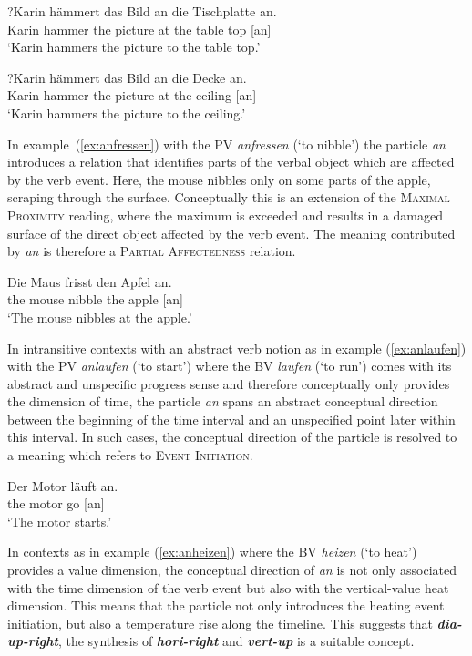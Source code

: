 \documentclass[output=paper]{langsci/langscibook}
\newcommand{\textci}[1]{\textit{\textbf{#1}}}
\begin{document}
\ea\label{ex:anhaemmernTischplatte}
\gll ?Karin hämmert das Bild an die Tischplatte an.\\
Karin hammer the picture at the {table top} [an]\\
\glt `Karin hammers the picture to the table top.'
\z

\ea\label{ex:anhaemmernDecke}
\gll ?Karin hämmert das Bild an die Decke an.\\
Karin hammer the picture at the ceiling [an]\\
\glt `Karin hammers the picture to the ceiling.'
\z

In example~(\ref{ex:anfressen}) with the PV \textit{anfressen} (`to
nibble') the particle \textit{an} introduces a relation that
identifies parts of the verbal object which are affected by the verb
event. Here, the mouse nibbles only on some parts of the apple,
scraping through the surface. Conceptually this is an extension of the
\textsc{Maximal Proximity} reading, where the maximum is exceeded and
results in a damaged surface of the direct object affected by the verb
event. The meaning contributed by \textit{an} is therefore a
\textsc{Partial Affectedness} relation.

\ea\label{ex:anfressen}
\gll Die Maus frisst den Apfel an.\\
the mouse nibble the apple [an]\\
\glt `The mouse nibbles at the apple.'
\z

In intransitive contexts with an abstract verb notion as in example
(\ref{ex:anlaufen}) with the PV \textit{anlaufen} (`to start') where
the BV \textit{laufen} (`to run') comes with its abstract and
unspecific progress sense and therefore conceptually only provides the
dimension of time, the particle \textit{an} spans an abstract
conceptual direction between the beginning of the time interval and an
unspecified point later within this interval. In such cases, the
conceptual direction of the particle is resolved to a meaning which
refers to \textsc{Event Initiation}.

\ea\label{ex:anlaufen}
\gll Der Motor läuft an.\\
the motor go [an]\\
\glt `The motor starts.'
\z

In contexts as in example (\ref{ex:anheizen}) where the BV
\textit{heizen} (`to heat') provides a value dimension, the conceptual
direction of \textit{an} is not only associated with the time
dimension of the verb event but also with the vertical-value heat
dimension. This means that the particle not only introduces the
heating event initiation, but also a temperature rise along the
timeline. This suggests that \textci{dia-up-right}, the synthesis of
\textci{hori-right} and \textci{vert-up} is a suitable concept.
\end{document}
